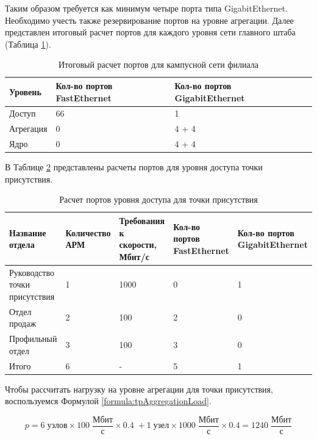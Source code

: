 \documentclass[14pt, a4paper]{extarticle}
\numberwithin{equation}{section}
\begin{document}
Таким образом требуется как минимум четыре порта типа GigabitEthernet.
Необходимо учесть также резервирование портов на уровне агрегации.
Далее представлен итоговый расчет портов для каждого уровня сети
главного штаба (Таблица \ref{table:filialCampusNet}). 

\begin{table}[H]
\centering
\small
\caption{Итоговый расчет портов для кампусной сети филиала}
\begin{tabular}{|m{2cm}|m{4cm}|m{3cm}|m{3.5cm}|}
\hline
\textbf{Уровень} & \textbf{Кол-во портов FastEthernet} & \textbf{Кол-во портов GigabitEthernet} \\
\hline
Доступ & 66 & 1 \\
\hline
Агрегация & 0 & 4 + 4 \\
\hline
Ядро & 0 & 4 + 4 \\
\hline
\end{tabular}
\label{table:filialCampusNet}
\end{table}

В Таблице \ref{table:tpAccessLevel} представлены расчеты портов для уровня доступа 
точки присутствия.

\begin{table}[H]
\centering
\small
\caption{Расчет портов уровня доступа для точки присутствия}
\begin{tabular}{|m{4cm}|m{2.5cm}|m{2.5cm}|m{2.5cm}|m{3cm}|}
\hline
\textbf{Название отдела} & \textbf{Количество АРМ} & \textbf{Требования к скорости, Мбит/с} & \textbf{Кол-во портов FastEthernet} & \textbf{Кол-во портов GigabitEthernet} \\
\hline
Руководство точки присутствия & 1 & 1000 & 0 & 1 \\
\hline
Отдел продаж & 2 & 100 & 2 & 0 \\
\hline
Профильный отдел & 3 & 100 & 3 & 0 \\
\hline
Итого & 6 & - & 5 & 1 \\
\hline
\end{tabular}
\label{table:tpAccessLevel}
\end{table}

Чтобы рассчитать нагрузку на уровне агрегации для 
точки присутствия, воспользуемся Формулой \ref{formula:tpAggregationLoad}.

\begin{equation}
p = 6 \; \text{узлов} \times 100\;\frac{\text{Мбит}}{\text{с}} \times 0.4 \; + 1 \; \text{узел} \times 1000\;\frac{\text{Мбит}}{\text{с}} \times 0.4 = 1240\;\frac{\text{Мбит}}{\text{с}}
\label{formula:tpAggregationLoad}
\end{equation}
\end{document}
